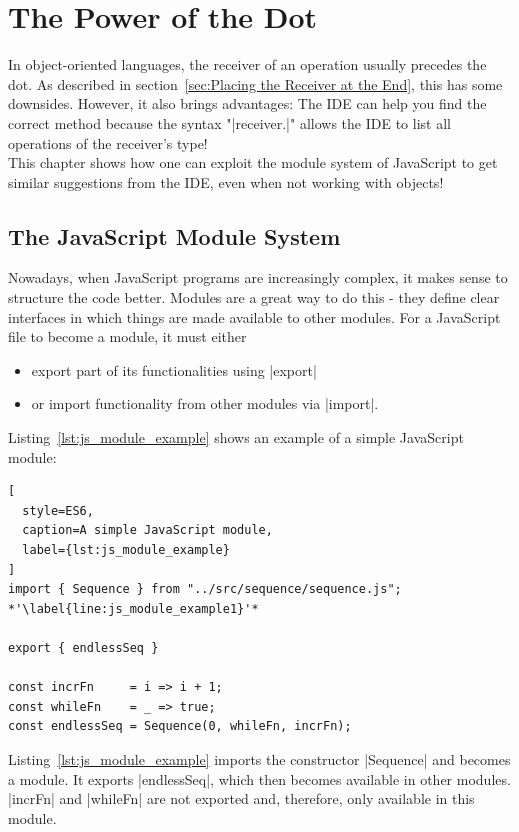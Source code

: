 \chapter{The Power of the Dot} %
\label{chap:The Power of the Dot}
In object-oriented languages, the receiver of an operation usually precedes the
dot. As described in section~\ref{sec:Placing the Receiver at the End}, this
has some downsides. However, it also brings advantages: The IDE can help you
find the correct method because the syntax "|receiver.|" allows the IDE to list
all operations of the receiver's type! \cite[Ch. "The Power of the
Dot"]{frege_goodness} \\ 
This chapter shows how one can exploit the module
system of JavaScript to get similar suggestions from the IDE, even when not
working with objects!

\section{The JavaScript Module System} %
\label{sec:The JavaScript Module System}

Nowadays, when JavaScript programs are increasingly complex, it makes sense to
structure the code better. Modules are a great way to do this - they define
clear interfaces in which things are made available to other modules.
For a JavaScript file to become a module, it must either
\begin{itemize}
  \item export part of its functionalities using |export|
  \item or import functionality from other modules via |import|.
\end{itemize}

Listing~\ref{lst:js_module_example} shows an example of a simple JavaScript
module:
\begin{lstlisting}[
  style=ES6,
  caption=A simple JavaScript module,
  label={lst:js_module_example}
]
import { Sequence } from "../src/sequence/sequence.js"; *'\label{line:js_module_example1}'*

export { endlessSeq }

const incrFn     = i => i + 1;
const whileFn    = _ => true;
const endlessSeq = Sequence(0, whileFn, incrFn);
\end{lstlisting}

Listing~\ref{lst:js_module_example} imports the constructor |Sequence| and
becomes a module. It exports |endlessSeq|, which then becomes available in
other modules. |incrFn| and |whileFn| are not exported and, therefore, only
available in this module.

